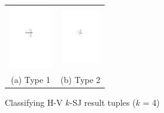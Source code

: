 \documentclass[sigconf]{acmart}
\def\figcapup{\vspace{-2mm}}
\def\figcapdown{\vspace{-2mm}}
\begin{document}
\begin{figure}
    \begin{tabular}{cc}
        \includegraphics[height=27mm]{./artwork/type1} &
        \hspace{5mm} \includegraphics[height=23mm]{./artwork/type2} \\
        (a) Type 1 &
        (b) Type 2
    \end{tabular}

    \figcapup
    \caption{Classifying H-V $k$-SJ result tuples ($k$ = 4)}
    \label{fig:hv:types}
    \figcapdown
\end{figure}
\end{document}
